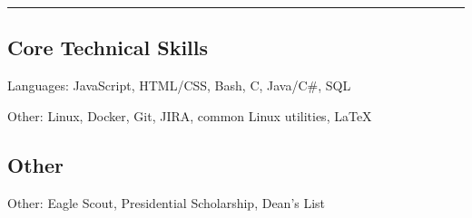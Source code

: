 \documentclass[10pt, letterpaper]{article}
\newenvironment{indentsection}[1]%
{\begin{list}{}%
	{\setlength{\leftmargin}{#1}}%
	\item[]%
}
{\end{list}}
\newcommand{\CPP}
{C\nolinebreak[4]\hspace{-.05em}\raisebox{.22ex}{\footnotesize\bf ++}}
\begin{document}
\hrule
\vspace{-0.4em}

\subsection*{Core Technical Skills}
\begin{indentsection}{\parindent}
\begin{description*}
	\item[Languages:]
	JavaScript, HTML/CSS, Bash, \CPP, Java/C\#, SQL
	\item[Other:]
	Linux, Docker, Git, JIRA, common Linux utilities, \LaTeX
\end{description*}
\end{indentsection}

\subsection*{Other}
\begin{indentsection}{\parindent}
\begin{description*}
	\item[Other:]
	Eagle Scout, Presidential Scholarship, Dean's List
\end{description*}
\end{indentsection}
\end{document}
